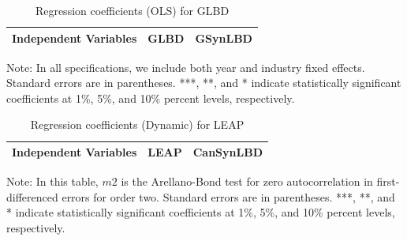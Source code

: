 \begin{table}[H]
  \centering
 \caption{Regression coefficients (OLS) for GLBD} \label{tab:OLS_ger} \medskip
\renewcommand{\arraystretch}{1}
\setlength{\tabcolsep}{14pt}
\begin{tabular}{l|c |c}
\toprule
\textbf{Independent Variables}&\textbf{GLBD} &  \textbf{GSynLBD}\\
\midrule

   \bottomrule
  \end{tabular} 
\begin{tablenotes}
\small
\item Note: In all specifications, we include both year and industry fixed effects. Standard errors are in parentheses.  ***, **, and * indicate statistically significant coefficients at 1\%, 5\%, and 10\% percent levels, respectively.
 \end{tablenotes}
\end{table}



\begin{table}[H]
  \centering
\begin{threeparttable}
 \caption{Regression coefficients (Dynamic) for LEAP} \label{tab:Dynamic - GMM_can} \medskip
\renewcommand{\arraystretch}{1}
\begin{tabular}{l|c c| c c}
\toprule
\textbf{Independent Variables}&\multicolumn{2}{c|}{\textbf{LEAP}} &  \multicolumn{2}{c}{\textbf{CanSynLBD}}\\
\midrule

   \bottomrule
  \end{tabular} 
\begin{tablenotes}
\small
\item Note: In this table, $m2$ is the Arellano-Bond test for zero autocorrelation in first-differenced errors for order two. Standard errors are in parentheses. ***, **, and * indicate statistically significant coefficients at 1\%, 5\%, and 10\% percent levels, respectively.
 \end{tablenotes}
 \end{threeparttable}
\end{table}

